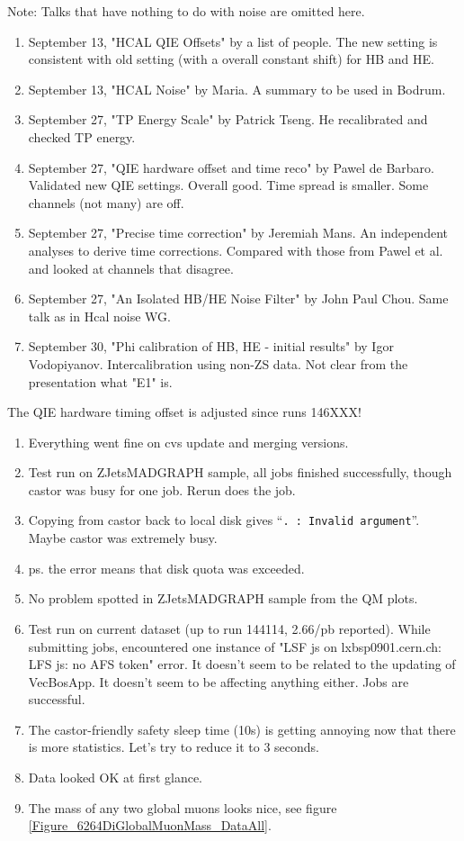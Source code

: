 
Note: Talks that have nothing to do with noise are omitted here.

\begin{enumerate}
\item September 13, "HCAL QIE Offsets" by a list of people.  The new setting is consistent with old setting (with a overall constant shift) for HB and HE.
\item September 13, "HCAL Noise" by Maria.  A summary to be used in Bodrum.
\item September 27, "TP Energy Scale" by Patrick Tseng.  He recalibrated and checked TP energy.
\item September 27, "QIE hardware offset and time reco" by Pawel de Barbaro.  Validated new QIE settings.  Overall good.  Time spread is smaller.  Some channels (not many) are off.
\item September 27, "Precise time correction" by Jeremiah Mans.  An independent analyses to derive time corrections.  Compared with those from Pawel et al. and looked at channels that disagree.
\item September 27, "An Isolated HB/HE Noise Filter" by John Paul Chou.  Same talk as in Hcal noise WG.
\item September 30, "Phi calibration of HB, HE - initial results" by Igor Vodopiyanov.  Intercalibration using non-ZS data.  Not clear from the presentation what "E1" is.
\end{enumerate}

The QIE hardware timing offset is adjusted since runs 146XXX! 


\begin{enumerate}
\item Everything went fine on cvs update and merging versions.
\item Test run on ZJetsMADGRAPH sample, all jobs finished successfully, though castor was busy for one job.  Rerun does the job.
\item Copying from castor back to local disk gives ``\texttt{. : Invalid argument}''.  Maybe castor was extremely busy.
\item ps. the error means that disk quota was exceeded.
\item No problem spotted in ZJetsMADGRAPH sample from the QM plots.
\item Test run on current dataset (up to run 144114, 2.66/pb reported).  While submitting jobs, encountered one instance of
"LSF js on lxbsp0901.cern.ch: LFS js: no AFS token" error.  It doesn't seem to be related to the updating of VecBosApp.
It doesn't seem to be affecting anything either.  Jobs are successful.
\item The castor-friendly safety sleep time (10s) is getting annoying now that there is more statistics.  Let's try to reduce it to 3 seconds.
\item Data looked OK at first glance.
\item The mass of any two global muons looks nice, see figure \ref{Figure_6264DiGlobalMuonMass_DataAll}.
\end{enumerate}


